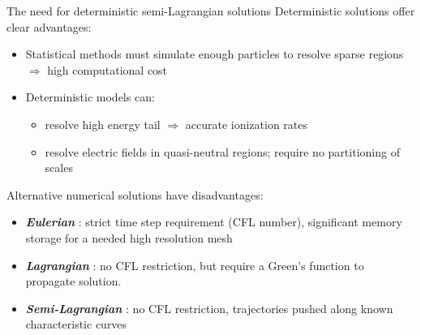 \documentclass{beamer}
\begin{document}
\begin{frame}{The need for deterministic semi-Lagrangian solutions}
Deterministic solutions offer clear advantages:
\begin{itemize}
\item Statistical methods must simulate enough particles to resolve sparse regions $\Rightarrow$ high computational cost
\item Deterministic models can:
\begin{itemize}
\item resolve high energy tail $\Rightarrow$ accurate ionization rates
\item resolve electric fields in quasi-neutral regions; require no partitioning of scales
\end{itemize}
\end{itemize}

Alternative numerical solutions have disadvantages:

\begin{itemize}
\item \textbf{\emph{Eulerian}} : strict time step requirement (CFL number), significant memory storage for a needed high resolution mesh
\item \textbf{\emph{Lagrangian}} : no CFL restriction, but require a Green's function to propagate solution. 
\item \textbf{\emph{Semi-Lagrangian}} : no CFL restriction, trajectories pushed along known characteristic curves
\end{itemize}



\end{frame}





\end{document}
